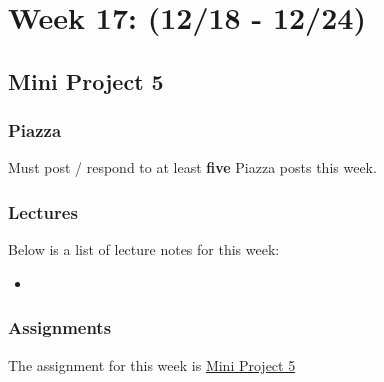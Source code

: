 \clearpage
\chapter{Week 17: (12/18 - 12/24)}

\section{Mini Project 5}

\subsection{Piazza}

Must post / respond to at least \textbf{five} Piazza posts this week.  

\subsection{Lectures}

\noindent Below is a list of lecture notes for this week:

\begin{itemize}
    \item {}
\end{itemize}

\subsection{Assignments}

The assignment for this week is \href{https://applied.cs.colorado.edu/mod/assign/view.php?id=49453}{Mini Project 5}  